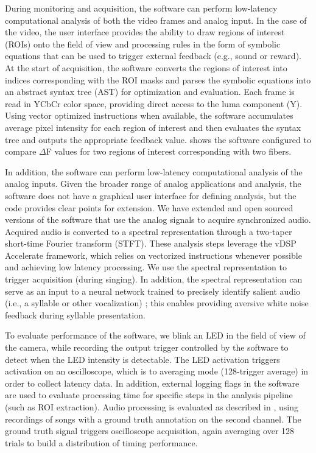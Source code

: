 During monitoring and acquisition, the software can perform low-latency
computational analysis of both the video frames and analog input. In 
the case of the video, the user interface provides the ability to 
draw regions of interest (ROIs) onto the field of view and processing 
rules in the form of symbolic equations that can be used to trigger 
external feedback (e.g., sound or reward). At the start of
acquisition, the software converts the regions of interest into indices 
corresponding with the ROI masks and parses the symbolic equations 
into an abstract syntax tree (AST) for optimization and evaluation. 
Each frame is read in YCbCr color 
space, providing direct access to the luma component (Y). Using vector
optimized instructions when available, the software accumulates average 
pixel intensity for each region of interest and then evaluates the 
syntax tree and outputs the appropriate feedback value.  
shows the software configured to compare $\Delta$F values for two 
regions of interest corresponding with two fibers.

In addition, the software can perform low-latency computational 
analysis of the analog inputs. Given the broader range of analog 
applications and analysis, the software does not have a graphical 
user interface for defining analysis, but the code provides clear 
points for extension. We have extended and open sourced versions 
of the software that use the analog signals to acquire synchronized 
audio. Acquired audio is converted to a spectral representation 
through a two-taper short-time Fourier transform (STFT). These 
analysis steps leverage the vDSP Accelerate framework, which 
relies on vectorized instructions whenever possible and achieving 
low latency processing. We use the spectral representation to 
trigger acquisition (during singing). In addition, the spectral
representation can serve as an input to a neural network trained 
to precisely identify salient audio (i.e., a syllable or other 
vocalization) \cite{Pearre:2017cs}; this enables providing 
aversive white noise feedback during syllable presentation.

To evaluate performance of the software, we blink an LED in the 
field of view of the camera, while recording the output trigger 
controlled by the software to detect when the LED intensity is 
detectable. The LED activation triggers activation on an 
oscilloscope, which is to averaging mode (128-trigger average) 
in order to collect latency data. In addition, external logging
flags in the software are used to evaluate processing time for 
specific steps in the analysis pipeline (such as ROI extraction).
Audio processing is evaluated as described in \cite{Pearre:2017cs},
using recordings of songs with a ground truth annotation on the 
second channel. The ground truth signal triggers oscilloscope 
acquisition, again averaging over 128 trials to build a distribution 
of timing performance.

